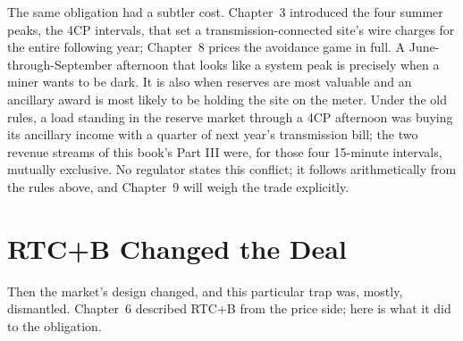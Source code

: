 The same obligation had a subtler cost. Chapter~3 introduced the four summer peaks, the 4CP intervals, that set a transmission-connected site's wire charges for the entire following year; Chapter~8 prices the avoidance game in full. A June-through-September afternoon that looks like a system peak is precisely when a miner wants to be dark. It is also when reserves are most valuable and an ancillary award is most likely to be holding the site on the meter. Under the old rules, a load standing in the reserve market through a 4CP afternoon was buying its ancillary income with a quarter of next year's transmission bill; the two revenue streams of this book's Part III were, for those four 15-minute intervals, mutually exclusive. No regulator states this conflict; it follows arithmetically from the rules above, and Chapter~9 will weigh the trade explicitly. %

\section{RTC+B Changed the Deal}

Then the market's design changed, and this particular trap was, mostly, dismantled. Chapter~6 described RTC+B from the price side; here is what it did to the obligation.

